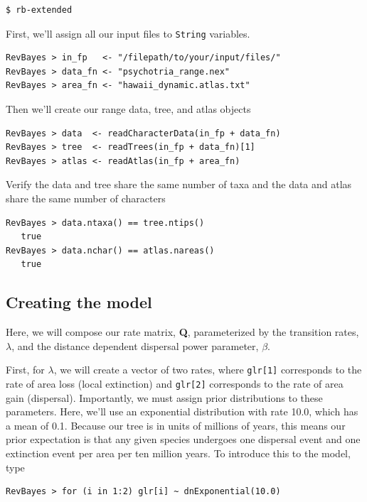 \documentclass[11pt]{article}
\begin{document}
\begin{snugshade}
\begin{lstlisting}
$ rb-extended
\end{lstlisting}
\end{snugshade}

First, we'll assign all our input files to {\tt String} variables.
\begin{snugshade}
\begin{lstlisting}
RevBayes > in_fp   <- "/filepath/to/your/input/files/"
RevBayes > data_fn <- "psychotria_range.nex"
RevBayes > area_fn <- "hawaii_dynamic.atlas.txt"
\end{lstlisting}
\end{snugshade}

Then we'll create our range data, tree, and atlas objects

\begin{snugshade}
\begin{lstlisting}
RevBayes > data  <- readCharacterData(in_fp + data_fn)
RevBayes > tree  <- readTrees(in_fp + data_fn)[1]
RevBayes > atlas <- readAtlas(in_fp + area_fn)
\end{lstlisting}
\end{snugshade}

Verify the data and tree share the same number of taxa and the data and atlas share the same number of characters

\begin{snugshade}
\begin{lstlisting}
RevBayes > data.ntaxa() == tree.ntips()
   true
RevBayes > data.nchar() == atlas.nareas()
   true
\end{lstlisting}
\end{snugshade}


\subsection{Creating the model}

Here, we will compose our rate matrix, {\bf Q}, parameterized by the transition rates, $\lambda$, and the distance dependent dispersal power parameter, $\beta$.

First, for $\lambda$, we will create a vector of two rates, where {\tt glr[1]} corresponds to the rate of area loss (local extinction) and {\tt glr[2]} corresponds to the rate of area gain (dispersal).
Importantly, we must assign prior distributions to these parameters.
Here, we'll use an exponential distribution with rate 10.0, which has a mean of 0.1.
Because our tree is in units of millions of years, this means our prior expectation is that any given species undergoes one dispersal event and one extinction event per area per ten million years.
To introduce this to the model, type
\begin{snugshade}
\begin{lstlisting}
RevBayes > for (i in 1:2) glr[i] ~ dnExponential(10.0)
\end{lstlisting}
\end{snugshade}
\end{document}
